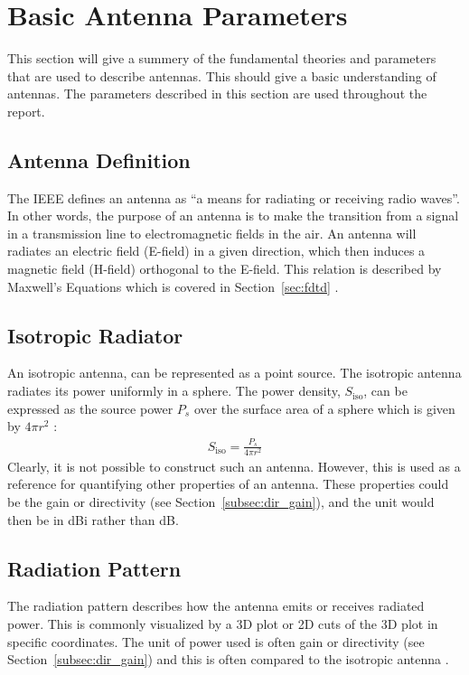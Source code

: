 \section{Basic Antenna Parameters}
\label{sec:basicantennaparams}
\begin{aautop}
This section will give a summery of the fundamental theories and parameters that are used to describe antennas. This should give a basic understanding of antennas. The parameters described in this section are used throughout the report. 
\end{aautop}

\subsection{Antenna Definition}
\label{subsec:antenna-def}
The IEEE defines an antenna as ``a means for radiating or receiving radio waves''. In other words, the purpose of an antenna is to make the transition from a signal in a transmission line to electromagnetic fields in the air. An antenna will radiates an electric field (E-field) in a given direction, which then induces a magnetic field (H-field) orthogonal to the E-field. This relation is described by Maxwell's Equations which is covered in Section~\ref{sec:fdtd} \cite{balanis2012antenna}.

\subsection{Isotropic Radiator}
\label{subsec:isotropic-ant}
An isotropic antenna, can be represented as a point source. The isotropic antenna radiates its power uniformly in a sphere. The power density, $S_{\text{iso}}$, can be expressed as the source power $P_s$ over the surface area of a sphere which is given by $4\pi r^2$ \cite{balanis2012antenna}:
\begin{align} %
    S_{\text{iso}} = \frac{P_s}{4\pi r^2}
\end{align}
Clearly, it is not possible to construct such an antenna. However, this is used as a reference for quantifying other properties of an antenna. These properties could be the gain or directivity (see Section~\ref{subsec:dir_gain}), and the unit would then be in \si{dBi} rather than \si{dB}.

\subsection{Radiation Pattern}
\label{subsec:radiation-p}
The radiation pattern describes how the antenna emits or receives radiated power. This is commonly visualized by a 3D plot or 2D cuts of the 3D plot in specific coordinates. The unit of power used is often gain or directivity (see Section~\ref{subsec:dir_gain}) and this is often compared to the isotropic antenna \cite{balanis2012antenna}.

